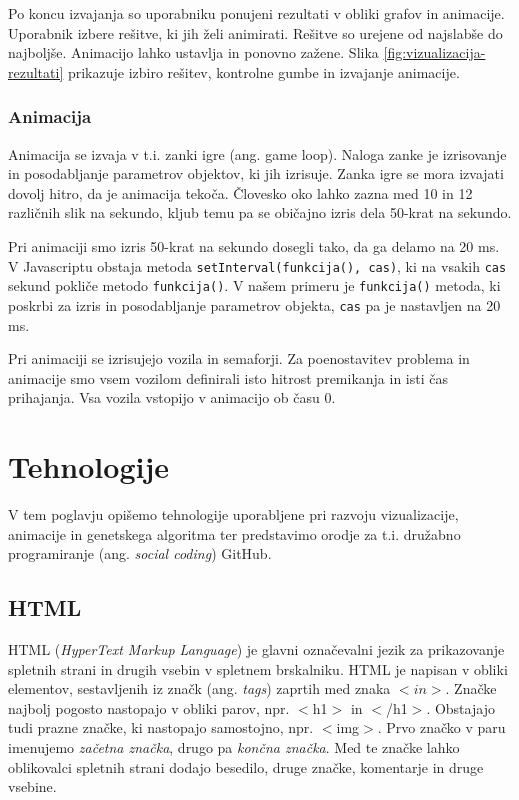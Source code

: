 \documentclass[a4paper, 12pt]{book}
\begin{document}
Po koncu izvajanja so uporabniku ponujeni rezultati v obliki grafov in animacije. Uporabnik izbere re\v sitve, ki jih \v zeli animirati. Re\v sitve so urejene od najslab\v se do najbolj\v se. Animacijo lahko ustavlja in ponovno za\v zene. Slika \ref{fig:vizualizacija-rezultati} prikazuje izbiro re\v sitev, kontrolne gumbe in izvajanje animacije.


\subsection{Animacija}
Animacija se izvaja v t.i. zanki igre (ang. game loop). Naloga zanke je izrisovanje in posodabljanje parametrov objektov, ki jih izrisuje. Zanka igre se mora izvajati dovolj hitro, da je animacija teko\v ca. \v Clovesko oko lahko zazna med 10 in 12 razli\v cnih slik na sekundo, kljub temu pa se obi\v cajno izris dela 50-krat na sekundo.

Pri animaciji smo izris 50-krat na sekundo dosegli tako, da ga delamo na 20 ms. V Javascriptu obstaja metoda \verb+setInterval(funkcija(), cas)+, ki na vsakih \verb+cas+ sekund pokli\v ce metodo \verb+funkcija()+. V na\v sem primeru je \verb+funkcija()+ metoda, ki poskrbi za izris in posodabljanje parametrov objekta, \verb+cas+ pa je nastavljen na 20 ms.

Pri animaciji se izrisujejo vozila in semaforji.  Za poenostavitev problema in  animacije smo vsem vozilom definirali isto hitrost premikanja in isti \v cas prihajanja. Vsa vozila vstopijo v animacijo ob \v casu 0.

\chapter{Tehnologije}
\label{ch3}
V tem poglavju opi\v semo tehnologije uporabljene pri razvoju vizualizacije, animacije in genetskega algoritma ter predstavimo orodje za t.i. dru\v zabno programiranje (ang. \textit{social coding}) GitHub.

\section{HTML}

HTML (\textit{HyperText Markup Language}) je glavni ozna\v cevalni jezik za prikazovanje spletnih strani in drugih vsebin v spletnem brskalniku.
HTML je napisan v obliki elementov, sestavljenih iz zna\v ck (ang. \textit{tags}) zaprtih med znaka $< in >$. Zna\v cke najbolj pogosto nastopajo v obliki parov, npr. $<$h1$>$ in $<$/h1$>$. Obstajajo tudi prazne zna\v cke, ki nastopajo samostojno, npr. $<$img$>$. Prvo zna\v cko v paru imenujemo \textit{za\v cetna zna\v cka}, drugo pa \textit{kon\v cna zna\v cka}. Med te zna\v cke lahko oblikovalci spletnih strani dodajo besedilo, druge zna\v cke, komentarje in druge vsebine.
\end{document}
